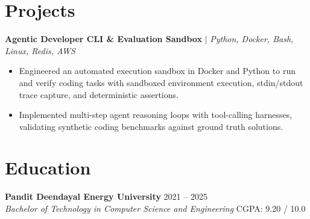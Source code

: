 \documentclass[10pt]{article}
\newcommand{\rItemList}{\begin{itemize}[leftmargin=1.1em, itemsep=1.0pt, topsep=1.0pt, parsep=0pt, label=\textbullet]}
\newcommand{\rEndItemList}{\end{itemize}}
\begin{document}
\section{Projects}

\textbf{Agentic Developer CLI \& Evaluation Sandbox} $\vert$ \textit{Python, Docker, Bash, Linux, Redis, AWS} \\
\rItemList
\item Engineered an automated execution sandbox in Docker and Python to run and verify coding tasks with sandboxed environment execution, stdin/stdout trace capture, and deterministic assertions.
\item Implemented multi-step agent reasoning loops with tool-calling harnesses, validating synthetic coding benchmarks against ground truth solutions.
\rEndItemList

\section{Education}

\textbf{Pandit Deendayal Energy University} \hfill 2021 -- 2025 \\
\textit{Bachelor of Technology in Computer Science and Engineering} \hfill CGPA: 9.20 / 10.0
\end{document}
